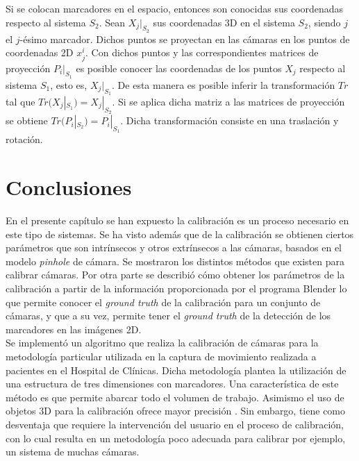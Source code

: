 Si se colocan marcadores en el espacio, entonces son conocidas sus coordenadas respecto al sistema $S_2$. Sean $X_j|_{S_2}$ sus coordenadas 3D en el sistema $S_2$, siendo $j$ el $j$-ésimo marcador. Dichos puntos se proyectan en las cámaras en los puntos de coordenadas 2D $x_j^i$. Con dichos puntos y las correspondientes matrices de proyección $P_i|_{S_1}$ es posible conocer las coordenadas de los puntos $X_j$ respecto al sistema $S_1$, esto es, $X_j|_{S_1}$. De esta manera es posible inferir la transformación $Tr$ tal que $Tr(X_j|_{S_1}) = X_j|_{S_2}$. Si se aplica dicha matriz a las matrices de proyección se obtiene $Tr(P_i|_{S_2}) = P_i|_{S_1} $. Dicha transformación consiste en una traslación y rotación.


\section{Conclusiones}

En el presente capítulo se han expuesto la calibración es un proceso necesario en este tipo de sistemas. Se ha visto además que de la calibración se obtienen ciertos parámetros que son intrínsecos y otros extrínsecos a las cámaras, basados en el modelo \textit{pinhole} de cámara. Se mostraron los distintos métodos que existen para calibrar cámaras. Por otra parte se describió cómo obtener los parámetros de la calibración a partir de la información proporcionada por el programa Blender lo que permite conocer el \textit{ground truth} de la calibración para un conjunto de cámaras, y que a su vez, permite tener el \textit{ground truth} de la detección de los marcadores en las imágenes 2D.\\

Se implementó un algoritmo que realiza la calibración de cámaras para la metodología particular utilizada en la captura de movimiento realizada a pacientes en el Hospital de Clínicas. Dicha metodología plantea la utilización de una estructura de tres dimensiones con marcadores. Una característica de este método es que permite abarcar todo el volumen de trabajo. Asimismo el uso de objetos 3D para la calibración ofrece mayor precisión \cite{zhang_libro}. Sin embargo, tiene como desventaja que requiere la intervención del usuario en el proceso de calibración, con lo cual resulta en un metodología poco adecuada para calibrar por ejemplo, un sistema de muchas cámaras.\\



